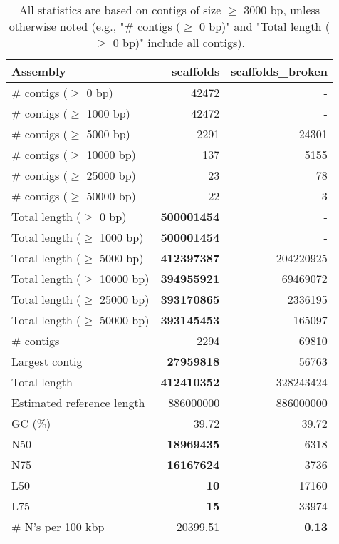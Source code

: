 \documentclass[12pt,a4paper]{article}
\begin{document}
\begin{table}[ht]
\begin{center}
\caption{All statistics are based on contigs of size $\geq$ 3000 bp, unless otherwise noted (e.g., "\# contigs ($\geq$ 0 bp)" and "Total length ($\geq$ 0 bp)" include all contigs).}
\begin{tabular}{|l*{2}{|r}|}
\hline
Assembly & scaffolds & scaffolds\_broken \\ \hline
\# contigs ($\geq$ 0 bp) & 42472 & - \\ \hline
\# contigs ($\geq$ 1000 bp) & 42472 & - \\ \hline
\# contigs ($\geq$ 5000 bp) & 2291 & 24301 \\ \hline
\# contigs ($\geq$ 10000 bp) & 137 & 5155 \\ \hline
\# contigs ($\geq$ 25000 bp) & 23 & 78 \\ \hline
\# contigs ($\geq$ 50000 bp) & 22 & 3 \\ \hline
Total length ($\geq$ 0 bp) & {\bf 500001454} & - \\ \hline
Total length ($\geq$ 1000 bp) & {\bf 500001454} & - \\ \hline
Total length ($\geq$ 5000 bp) & {\bf 412397387} & 204220925 \\ \hline
Total length ($\geq$ 10000 bp) & {\bf 394955921} & 69469072 \\ \hline
Total length ($\geq$ 25000 bp) & {\bf 393170865} & 2336195 \\ \hline
Total length ($\geq$ 50000 bp) & {\bf 393145453} & 165097 \\ \hline
\# contigs & 2294 & 69810 \\ \hline
Largest contig & {\bf 27959818} & 56763 \\ \hline
Total length & {\bf 412410352} & 328243424 \\ \hline
Estimated reference length & 886000000 & 886000000 \\ \hline
GC (\%) & 39.72 & 39.72 \\ \hline
N50 & {\bf 18969435} & 6318 \\ \hline
N75 & {\bf 16167624} & 3736 \\ \hline
L50 & {\bf 10} & 17160 \\ \hline
L75 & {\bf 15} & 33974 \\ \hline
\# N's per 100 kbp & 20399.51 & {\bf 0.13} \\ \hline
\end{tabular}
\end{center}
\end{table}
\end{document}
